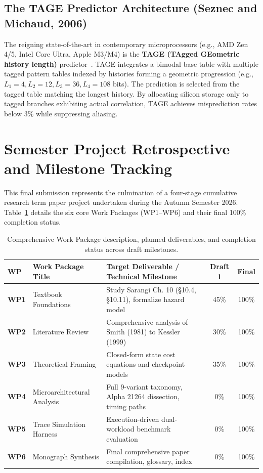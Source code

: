 \documentclass[11pt,a4paper]{article}
\begin{document}
\subsection{The TAGE Predictor Architecture (Seznec and Michaud, 2006)}
The reigning state-of-the-art in contemporary microprocessors (e.g., AMD Zen 4/5, Intel Core Ultra, Apple M3/M4) is the \textbf{TAGE (TAgged GEometric history length)} predictor~\cite{seznec2006}. TAGE integrates a bimodal base table with multiple tagged pattern tables indexed by histories forming a geometric progression (e.g., $L_1 = 4, L_2 = 12, L_3 = 36, L_4 = 108$ bits). The prediction is selected from the tagged table matching the longest history. By allocating silicon storage only to tagged branches exhibiting actual correlation, TAGE achieves misprediction rates below 3\% while suppressing aliasing.

\section{Semester Project Retrospective and Milestone Tracking}
\label{sec:retrospective}

This final submission represents the culmination of a four-stage cumulative research term paper project undertaken during the Autumn Semester 2026. Table~\ref{tab:work_packages} details the six core Work Packages (WP1--WP6) and their final 100\% completion status.

\begin{table}[htbp]
\centering
\caption{Comprehensive Work Package description, planned deliverables, and completion status across draft milestones.}
\label{tab:work_packages}
\vspace{0.5em}
\small
\begin{tabularx}{\linewidth}{l l X c c}
\toprule
\textbf{WP} & \textbf{Work Package Title} & \textbf{Target Deliverable / Technical Milestone} & \textbf{Draft 1} & \textbf{Final} \\
\midrule
\textbf{WP1} & Textbook Foundations & Study Sarangi Ch. 10 (\S10.4, \S10.11), formalize hazard model & 45\% & 100\% \\
\textbf{WP2} & Literature Review & Comprehensive analysis of Smith (1981) to Kessler (1999) & 30\% & 100\% \\
\textbf{WP3} & Theoretical Framing & Closed-form state cost equations and checkpoint models & 35\% & 100\% \\
\textbf{WP4} & Microarchitectural Analysis & Full 9-variant taxonomy, Alpha 21264 dissection, timing paths & 0\% & 100\% \\
\textbf{WP5} & Trace Simulation Harness & Execution-driven dual-workload benchmark evaluation & 0\% & 100\% \\
\textbf{WP6} & Monograph Synthesis & Final comprehensive paper compilation, glossary, index & 0\% & 100\% \\
\bottomrule
\end{tabularx}
\end{table}
\end{document}
